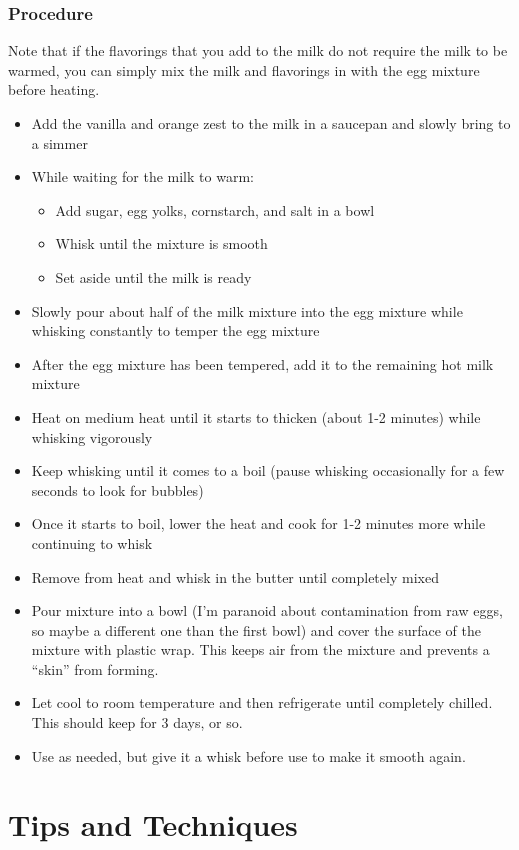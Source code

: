 \documentclass[10pt, openany]{book}
\begin{document}
\subsection{Procedure}
Note that if the flavorings that you add to the milk do not require the milk to be warmed, you can simply mix the milk and flavorings in with the egg mixture before heating.
\begin{itemize}
  \item Add the vanilla and orange zest to the milk in a saucepan and slowly bring to a simmer
  \item While waiting for the milk to warm:
  \begin{itemize}
    \item Add sugar, egg yolks, cornstarch, and salt in a bowl
    \item Whisk until the mixture is smooth
    \item Set aside until the milk is ready
  \end{itemize}
  \item Slowly pour about half of the milk mixture into the egg mixture while whisking constantly to temper the egg mixture
  \item After the egg mixture has been tempered, add it to the remaining hot milk mixture
  \item Heat on medium heat until it starts to thicken (about 1-2 minutes) while whisking vigorously
  \item Keep whisking until it comes to a boil (pause whisking occasionally for a few seconds to look for bubbles)
  \item Once it starts to boil, lower the heat and cook for 1-2 minutes more while continuing to whisk
  \item Remove from heat and whisk in the butter until completely mixed
  \item Pour mixture into a bowl (I'm paranoid about contamination from raw eggs, so maybe a different one than the first bowl) and cover the surface of the mixture with plastic wrap.  This keeps air from the mixture and prevents a ``skin'' from forming.
  \item Let cool to room temperature and then refrigerate until completely chilled.  This should keep for 3 days, or so.
  \item Use as needed, but give it a whisk before use to make it smooth again.
\end{itemize}
\chapter{Tips and Techniques}
\end{document}
